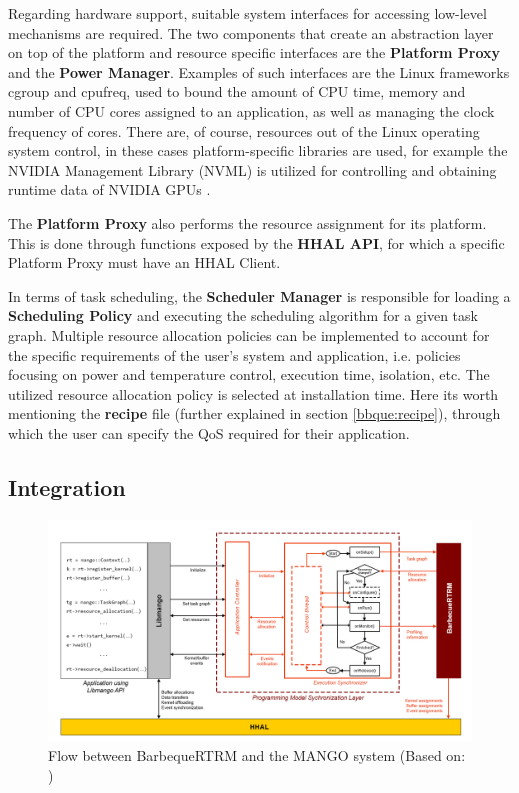Regarding hardware support, suitable system interfaces for accessing low-level mechanisms are required. The two components that create an abstraction layer on top of the platform and resource specific interfaces are the \textbf{Platform Proxy} and the \textbf{Power Manager}. Examples of such interfaces are the Linux frameworks cgroup and cpufreq, used to bound the amount of CPU time, memory and number of CPU cores assigned to an application, as well as managing the clock frequency of cores.
There are, of course, resources out of the Linux operating system control, in these cases platform-specific libraries are used, for example the NVIDIA Management Library (NVML) \cite{nvml} is utilized for controlling and obtaining runtime data of NVIDIA GPUs \cite{mango_exploring_manycore_architectures}.

The \textbf{Platform Proxy} also performs the resource assignment for its platform. This is done through functions exposed by the \textbf{HHAL API}, for which a specific Platform Proxy must have an HHAL Client.

In terms of task scheduling, the \textbf{Scheduler Manager} is responsible for loading a \textbf{Scheduling Policy} and executing the scheduling algorithm for a given task graph. Multiple resource allocation policies can be implemented to account for the specific requirements of the user's system and application, i.e. policies focusing on power and temperature control, execution time, isolation\cite{mango_exploring_manycore_architectures}, etc. The utilized resource allocation policy is selected at installation time. 
Here its worth mentioning the \textbf{recipe} file (further explained in section \ref{bbque:recipe}), through which the user can specify the QoS required for their application.

\subsection{Integration} \label{bbque:integration}

\begin{figure}[ht]
    \centering
    \includegraphics[width=\textwidth]{img/barbeque-flow.png}
    \captionsetup{justification=centering}
    \caption{Flow between BarbequeRTRM and the MANGO system (Based on: \cite{mango_exploring_manycore_architectures})}
    \label{fig:barbecue-flow}
\end{figure}

